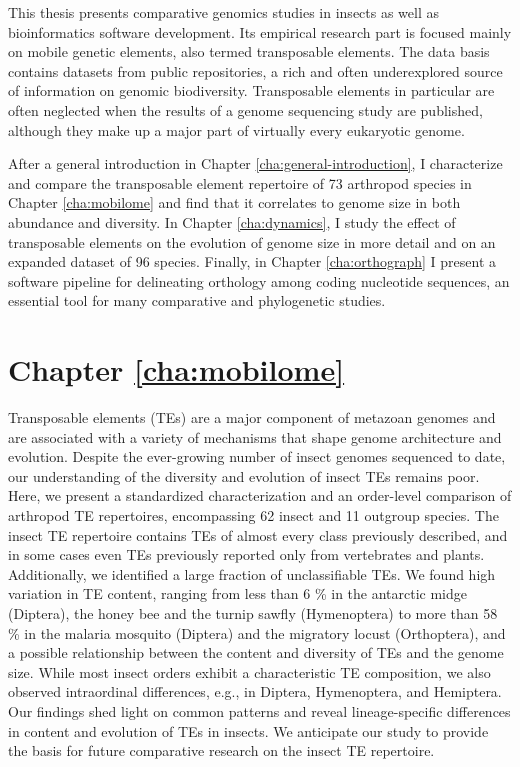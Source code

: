 

This thesis presents comparative genomics studies in insects as well as
bioinformatics software development. Its empirical research part is
focused mainly on mobile genetic elements, also termed transposable
elements. The data basis contains datasets from public repositories, a
rich and often underexplored source of information on genomic
biodiversity. Transposable elements in particular are often neglected
when the results of a genome sequencing study are published, although
they make up a major part of virtually every eukaryotic genome. 

After a general introduction in Chapter \ref{cha:general-introduction}, I
characterize and compare the transposable element repertoire of 73
arthropod species in Chapter \ref{cha:mobilome} and find that it
correlates to genome size in both abundance and diversity. In Chapter
\ref{cha:dynamics}, I study the effect of transposable elements on the
evolution of genome size in more detail and on an expanded dataset of 96
species. Finally, in Chapter \ref{cha:orthograph} I present a software
pipeline for delineating orthology among coding nucleotide sequences, an
essential tool for many comparative and phylogenetic studies.

\section*{Chapter \ref{cha:mobilome}}

Transposable elements (TEs) are a major component of metazoan genomes
and are associated with a variety of mechanisms that shape genome
architecture and evolution. Despite the ever-growing number of insect
genomes sequenced to date, our understanding of the diversity and
evolution of insect TEs remains poor. Here, we present a standardized
characterization and an order-level comparison of arthropod TE
repertoires, encompassing 62 insect and 11 outgroup species. The insect
TE repertoire contains TEs of almost every class previously described,
and in some cases even TEs previously reported only from vertebrates and
plants. Additionally, we identified a large fraction of unclassifiable
TEs. We found high variation in TE content, ranging from less than 6 \%
in the antarctic midge (Diptera), the honey bee and the turnip sawfly
(Hymenoptera) to more than 58 \% in the malaria mosquito (Diptera) and
the migratory locust (Orthoptera), and a possible relationship between
the content and diversity of TEs and the genome size. While most insect
orders exhibit a characteristic TE composition, we also observed
intraordinal differences, e.g., in Diptera, Hymenoptera, and Hemiptera.
Our findings shed light on common patterns and reveal lineage-specific
differences in content and evolution of TEs in insects. We anticipate
our study to provide the basis for future comparative research on the
insect TE repertoire.%

